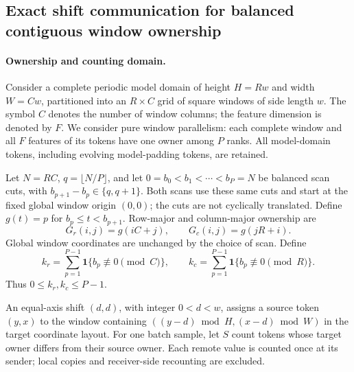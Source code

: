 
\subsection{Exact shift communication for balanced contiguous window ownership}
\label{sec:balanced-window-shift}

\paragraph{Ownership and counting domain.}
Consider a complete periodic model domain of height $H=Rw$ and width $W=Cw$,
partitioned into an $R\times C$ grid of square windows of side length $w$.
The symbol $C$ denotes the number of window columns; the feature dimension
is denoted by $F$. We consider pure window parallelism: each complete
window and all $F$ features of its tokens have one owner among $P$ ranks.
All model-domain tokens, including evolving model-padding tokens, are retained.

Let $N=RC$, $q=\lfloor N/P\rfloor$, and let
$0=b_0<b_1<\cdots<b_P=N$ be balanced scan cuts, with
$b_{p+1}-b_p\in\{q,q+1\}$. Both scans use these same cuts and start at the
fixed global window origin $(0,0)$; the cuts are not cyclically translated.
Define $g(t)=p$ for $b_p\le t<b_{p+1}$. Row-major and column-major ownership are
\begin{equation}
 G_r(i,j)=g(iC+j),\qquad G_c(i,j)=g(jR+i).
 \label{eq:balanced-owner}
\end{equation}
Global window coordinates are unchanged by the choice of scan. Define
\begin{equation}
 k_r=\sum_{p=1}^{P-1}\mathbf{1}\{b_p\not\equiv0\pmod C\},\qquad
 k_c=\sum_{p=1}^{P-1}\mathbf{1}\{b_p\not\equiv0\pmod R\}.
 \label{eq:ragged-cut-counts}
\end{equation}
Thus $0\le k_r,k_c\le P-1$.

An equal-axis shift $(d,d)$, with integer $0<d<w$, assigns a source token
$(y,x)$ to the window containing
$((y-d)\bmod H,(x-d)\bmod W)$ in the target coordinate layout.
For one batch sample, let $S$ count tokens whose target owner differs from
their source owner. Each remote value is counted once at its sender;
local copies and receiver-side recounting are excluded.

